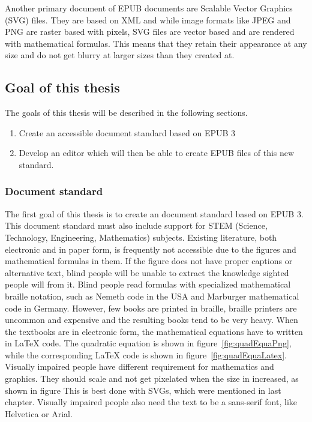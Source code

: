 Another primary document of EPUB documents are Scalable Vector Graphics (SVG) files. They are based on XML and while image formats like JPEG and PNG are raster based with pixels, SVG files are vector based and are rendered with mathematical formulas. This means that they retain their appearance at any size and do not get blurry at larger sizes than they created at.


\subsection{Goal of this thesis}

The goals of this thesis will be described in the following sections.

\begin{enumerate}
	\item Create an accessible document standard based on EPUB 3
	\item Develop an editor which will then be able to create EPUB files of this new standard.
\end{enumerate}

\subsubsection{Document standard}
The first goal of this thesis is to create an document standard based on EPUB 3. This document standard must also include support for STEM (Science, Technology, Engineering, Mathematics) subjects. Existing literature, both electronic and in paper form, is frequently not accessible due to the figures and mathematical formulas in them. If the figure does not have proper captions or alternative text, blind people will be unable to extract the knowledge sighted people will from it. Blind people read formulas with specialized mathematical braille notation, such as Nemeth code in the USA and Marburger mathematical code in Germany.\cite{augenbitWiki} However, few books are printed in braille, braille printers are uncommon and expensive and the resulting books tend to be very heavy. When the textbooks are in electronic form, the mathematical equations have to written in LaTeX code. The quadratic equation is shown in figure~\ref{fig:quadEquaPng}, while the corresponding LaTeX code is shown in figure~\ref{fig:quadEquaLatex}. Visually impaired people have different requirement for mathematics and graphics. They should scale and not get pixelated when the size in increased, as shown in figure This is best done with SVGs, which were mentioned in last chapter. Visually impaired people also need the text to be a sans-serif font, like Helvetica or Arial.\cite{pdfBarrierefrei}


